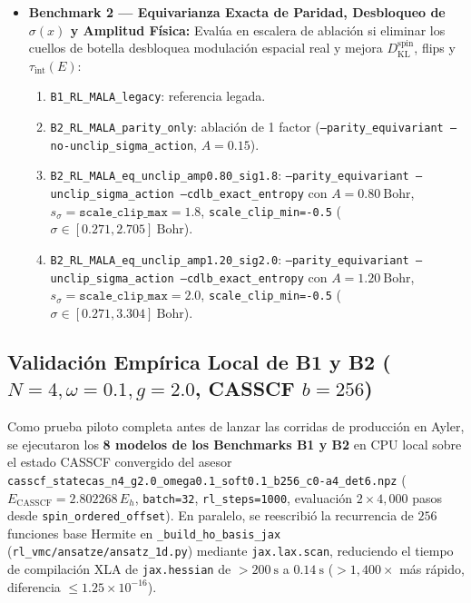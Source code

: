 \documentclass[10pt,a4paper]{article}
\begin{document}
\begin{itemize}
\item \textbf{Benchmark 2 — Equivarianza Exacta de Paridad, Desbloqueo de $\sigma(x)$ y Amplitud Física:} Evalúa en escalera de ablación si eliminar los cuellos de botella desbloquea modulación espacial real y mejora $D_{\mathrm{KL}}^{\mathrm{spin}}$, flips y $\tau_{\mathrm{int}}(E)$:
  \begin{enumerate}
  \item \texttt{B1\_RL\_MALA\_legacy}: referencia legada.
  \item \texttt{B2\_RL\_MALA\_parity\_only}: ablación de 1 factor (\texttt{--parity\_equivariant --no-unclip\_sigma\_action}, $A=0.15$).
  \item \texttt{B2\_RL\_MALA\_eq\_unclip\_amp0.80\_sig1.8}: \texttt{--parity\_equivariant --unclip\_sigma\_action --cdlb\_exact\_entropy} con $A=0.80\ \mathrm{Bohr}$, $s_\sigma = \texttt{scale\_clip\_max} = 1.8$, \texttt{scale\_clip\_min=-0.5} ($\sigma \in [0.271, 2.705]\ \mathrm{Bohr}$).
  \item \texttt{B2\_RL\_MALA\_eq\_unclip\_amp1.20\_sig2.0}: \texttt{--parity\_equivariant --unclip\_sigma\_action --cdlb\_exact\_entropy} con $A=1.20\ \mathrm{Bohr}$, $s_\sigma = \texttt{scale\_clip\_max} = 2.0$, \texttt{scale\_clip\_min=-0.5} ($\sigma \in [0.271, 3.304]\ \mathrm{Bohr}$).
  \end{enumerate}
\end{itemize}

\subsection{Validación Empírica Local de B1 y B2 ($N=4, \omega=0.1, g=2.0$, CASSCF $b=256$)}

Como prueba piloto completa antes de lanzar las corridas de producción en Ayler, se ejecutaron los \textbf{8 modelos de los Benchmarks B1 y B2} en CPU local sobre el estado CASSCF convergido del asesor \texttt{casscf\_statecas\_n4\_g2.0\_omega0.1\_soft0.1\_b256\_c0-a4\_det6.npz} ($E_{\mathrm{CASSCF}} = 2.802268\,E_h$, \texttt{batch=32}, \texttt{rl\_steps=1000}, evaluación $2\times 4{,}000$ pasos desde \texttt{spin\_ordered\_offset}). En paralelo, se reescribió la recurrencia de $256$ funciones base Hermite en \texttt{\_build\_ho\_basis\_jax} (\texttt{rl\_vmc/ansatze/ansatz\_1d.py}) mediante \texttt{jax.lax.scan}, reduciendo el tiempo de compilación XLA de \texttt{jax.hessian} de $>200\ \mathrm{s}$ a \textbf{$0.14\ \mathrm{s}$} ($>1{,}400\times$ más rápido, diferencia $\le 1.25\times 10^{-16}$).
\end{document}
